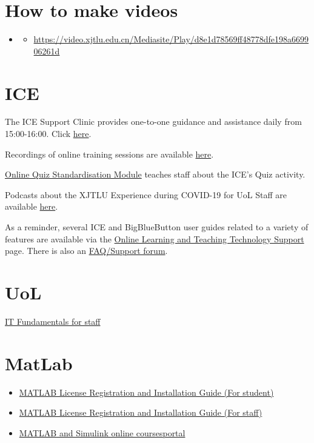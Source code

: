 \documentclass[
]{book}
\providecommand{\tightlist}{%
  \setlength{\itemsep}{0pt}\setlength{\parskip}{0pt}}
\newenvironment{rmdblock}[1]
  {\begin{shaded*}
  \begin{itemize}
  \renewcommand{\labelitemi}{
    \raisebox{-.7\height}[0pt][0pt]{
      {\setkeys{Gin}{width=2em,keepaspectratio}\texttt{[image: image/\#1]}}
    }
  }
  \item
  }
  {
  \end{itemize}
  \end{shaded*}
  }
\newenvironment{rmdvd}
  {\begin{rmdblock}{vd}}
  {\end{rmdblock}}
\begin{document}
\hypertarget{how-to-make-videos}{%
\section{How to make videos}\label{how-to-make-videos}}

\begin{rmdvd}
\begin{rmdvd}

\url{https://video.xjtlu.edu.cn/Mediasite/Play/d8e1d78569ff48778dfe198a669906261d}

\end{rmdvd}
\end{rmdvd}

\hypertarget{ice}{%
\section{ICE}\label{ice}}

The ICE Support Clinic provides one-to-one guidance and assistance daily from 15:00-16:00. Click \href{https://ice.xjtlu.edu.cn/mod/page/view.php?id=142089}{here}.

Recordings of online training sessions are available \href{https://ice.xjtlu.edu.cn/mod/glossary/view.php?id=128625}{here}.

\href{https://ice.xjtlu.edu.cn/course/view.php?id=1631}{Online Quiz Standardisation Module} teaches staff about the ICE's Quiz activity.

Podcasts about the XJTLU Experience during COVID-19 for UoL Staff are available \href{https://connect.xjtlu.edu.cn/view/view.php?t=kD90XzHKFxeqnty1Ppvc}{here}.

As a reminder, several ICE and BigBlueButton user guides related to a variety of features are available via the \href{https://ice.xjtlu.edu.cn/course/view.php?id=1605}{Online Learning and Teaching Technology Support} page. There is also an \href{https://ice.xjtlu.edu.cn/course/view.php?id=1605\&section=17}{FAQ/Support forum}.

\hypertarget{uol}{%
\section{UoL}\label{uol}}

\href{https://www.liverpool.ac.uk/csd/fundamentals/}{IT Fundamentals for staff}

\hypertarget{matlab}{%
\section{MatLab}\label{matlab}}

\begin{itemize}
\tightlist
\item
  \href{https://guide.xjtlu.edu.cn/how-to-register-and-install-matlab-license-for-student.html}{MATLAB License Registration and Installation Guide (For student)}
\item
  \href{https://guide.xjtlu.edu.cn/how-to-register-and-install-matlab-license-for-staff.html}{MATLAB License Registration and Installation Guide (For staff)}
\item
  \href{https://matlabacademy.mathworks.co}{MATLAB and Simulink online coursesportal}
\end{itemize}
\end{document}

